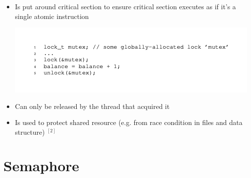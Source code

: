 \documentclass[12pt]{article}
\begin{document}
\begin{itemize}
\begin{enumerate}[1.]
        \bigskip
    \end{enumerate}
    \item Is put around critical section to ensure critical section executes
    as if it's a single atomic instruction

    \begin{center}
    \includegraphics[width=\linewidth]{images/midterm_1_solution_1.png}
    \end{center}
    \item Can only be released by the thread that acquired it
    \item Is used to protect shared resource (e.g. from race condition in files and data structure) $^{[2]}$
\end{itemize}

\section*{Semaphore}
\end{document}
